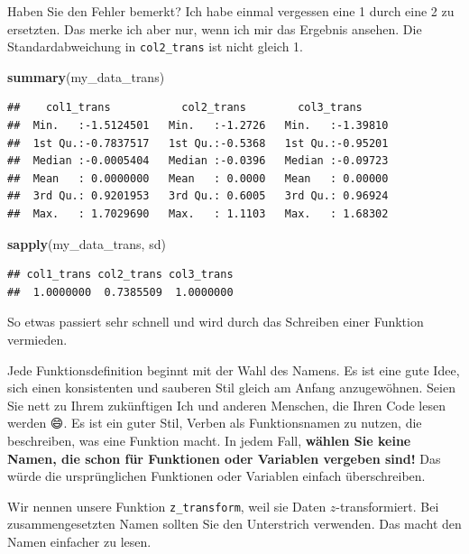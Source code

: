 \documentclass[]{book}
\newenvironment{Shaded}{\begin{snugshade}}{\end{snugshade}}
\newcommand{\KeywordTok}[1]{\textcolor[rgb]{0.13,0.29,0.53}{\textbf{#1}}}
\newcommand{\NormalTok}[1]{#1}
\begin{document}
Haben Sie den Fehler bemerkt? Ich habe einmal vergessen eine 1 durch eine 2 zu ersetzten. Das merke ich aber nur, wenn ich mir das Ergebnis ansehen. Die Standardabweichung in \texttt{col2\_trans} ist nicht gleich 1.

\begin{Shaded}
\begin{Highlighting}[]
\KeywordTok{summary}\NormalTok{(my_data_trans)}
\end{Highlighting}
\end{Shaded}

\begin{verbatim}
##    col1_trans           col2_trans        col3_trans      
##  Min.   :-1.5124501   Min.   :-1.2726   Min.   :-1.39810  
##  1st Qu.:-0.7837517   1st Qu.:-0.5368   1st Qu.:-0.95201  
##  Median :-0.0005404   Median :-0.0396   Median :-0.09723  
##  Mean   : 0.0000000   Mean   : 0.0000   Mean   : 0.00000  
##  3rd Qu.: 0.9201953   3rd Qu.: 0.6005   3rd Qu.: 0.96924  
##  Max.   : 1.7029690   Max.   : 1.1103   Max.   : 1.68302
\end{verbatim}

\begin{Shaded}
\begin{Highlighting}[]
\KeywordTok{sapply}\NormalTok{(my_data_trans, sd)}
\end{Highlighting}
\end{Shaded}

\begin{verbatim}
## col1_trans col2_trans col3_trans 
##  1.0000000  0.7385509  1.0000000
\end{verbatim}

So etwas passiert sehr schnell und wird durch das Schreiben einer Funktion vermieden.

Jede Funktionsdefinition beginnt mit der Wahl des Namens. Es ist eine gute Idee, sich einen konsistenten und sauberen Stil gleich am Anfang anzugewöhnen. Seien Sie nett zu Ihrem zukünftigen Ich und anderen Menschen, die Ihren Code lesen werden 😄. Es ist ein guter Stil, Verben als Funktionsnamen zu nutzen, die beschreiben, was eine Funktion macht. In jedem Fall, \textbf{wählen Sie keine Namen, die schon für Funktionen oder Variablen vergeben sind!} Das würde die ursprünglichen Funktionen oder Variablen einfach überschreiben.

Wir nennen unsere Funktion \texttt{z\_transform}, weil sie Daten \(z\)-transformiert. Bei zusammengesetzten Namen sollten Sie den Unterstrich verwenden. Das macht den Namen einfacher zu lesen.
\end{document}
